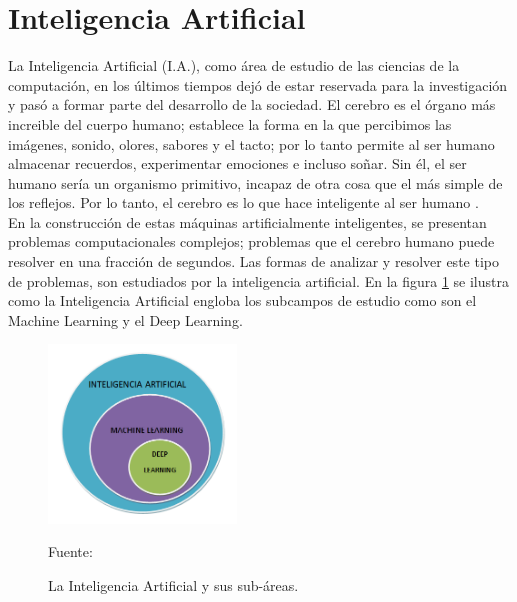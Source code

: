 \section{Inteligencia Artificial}
La Inteligencia Artificial (I.A.), como área de estudio de las ciencias de la computación, en los últimos tiempos dejó de estar reservada para la investigación y pasó a formar parte del desarrollo de la sociedad. El cerebro es el órgano más increible del cuerpo humano; establece la forma en la que percibimos las imágenes, sonido, olores, sabores y el tacto; por lo tanto permite al ser humano almacenar recuerdos, experimentar emociones e incluso soñar. Sin él, el ser humano sería un organismo primitivo, incapaz de otra cosa que el más simple de los reflejos. Por lo tanto, el cerebro es lo que hace inteligente al ser humano \cite{intro_ia}.\\

En la construcción de estas máquinas artificialmente inteligentes, se presentan problemas computacionales complejos; problemas que el cerebro humano puede resolver en una fracción de segundos. Las formas de analizar y resolver este tipo de problemas, son estudiados por la inteligencia artificial. En la figura \ref{fig:ia} se ilustra como la Inteligencia Artificial engloba los subcampos de estudio como son el Machine Learning y el Deep Learning.\\

\begin{figure}[H]
    \begin{center}
        \includegraphics[width=5cm]{img/capitulo_2/ia.png}
    \end{center}
    \begin{center}
        \caption{La Inteligencia Artificial y sus sub-áreas.}
        Fuente: \cite{ia}
        \label{fig:ia}
    \end{center}
\end{figure}

